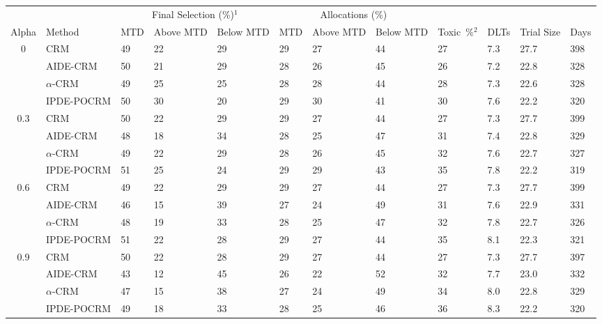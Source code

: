 \begin{tabular*}{\textwidth}{@{\extracolsep\fill}clllllllllll@{\extracolsep\fill}}
\toprule
&  & \multicolumn{3}{c}{Final Selection (\%)$^1$} & \multicolumn{3}{c}{Allocations (\%)} & &  &  &  \\
\multirow{2}{2em}{Alpha} & \multirow{2}{2em}{Method} & \multirow{2}{2em}{MTD} & \multirow{2}{2em}{Above MTD} & \multirow{2}{2em}{Below MTD} & \multirow{2}{2em}{MTD} & \multirow{2}{2em}{Above MTD} & \multirow{2}{2em}{Below MTD} & \multirow{2}{2em}{Toxic~\%$^2$} & \multirow{2}{2em}{DLTs} & \multirow{2}{2em}{Trial Size} & \multirow{2}{2em}{Days}  \\ \\ 
\midrule
\multirow{4}{2em}{0} & CRM & 49 & 22 & 29 & 29 & 27 & 44 & 27 & 7.3 & 27.7 & 398\\
 & AIDE-CRM & 50 & 21 & 29 & 28 & 26 & 45 & 26 & 7.2 & 22.8 & 328\\
 & $\alpha$-CRM & 49 & 25 & 25 & 28 & 28 & 44 & 28 & 7.3 & 22.6 & 328\\
 & IPDE-POCRM & 50 & 30 & 20 & 29 & 30 & 41 & 30 & 7.6 & 22.2 & 320\\
\midrule
\multirow{4}{2em}{0.3} & CRM & 50 & 22 & 29 & 29 & 27 & 44 & 27 & 7.3 & 27.7 & 399\\
 & AIDE-CRM & 48 & 18 & 34 & 28 & 25 & 47 & 31 & 7.4 & 22.8 & 329\\
 & $\alpha$-CRM & 49 & 22 & 29 & 28 & 26 & 45 & 32 & 7.6 & 22.7 & 327\\
 & IPDE-POCRM & 51 & 25 & 24 & 29 & 29 & 43 & 35 & 7.8 & 22.2 & 319\\
\midrule
\multirow{4}{2em}{0.6} & CRM & 49 & 22 & 29 & 29 & 27 & 44 & 27 & 7.3 & 27.7 & 399\\
 & AIDE-CRM & 46 & 15 & 39 & 27 & 24 & 49 & 31 & 7.6 & 22.9 & 331\\
 & $\alpha$-CRM & 48 & 19 & 33 & 28 & 25 & 47 & 32 & 7.8 & 22.7 & 326\\
 & IPDE-POCRM & 51 & 22 & 28 & 29 & 27 & 44 & 35 & 8.1 & 22.3 & 321\\
\midrule
\multirow{4}{2em}{0.9} & CRM & 50 & 22 & 28 & 29 & 27 & 44 & 27 & 7.3 & 27.7 & 397\\
 & AIDE-CRM & 43 & 12 & 45 & 26 & 22 & 52 & 32 & 7.7 & 23.0 & 332\\
 & $\alpha$-CRM & 47 & 15 & 38 & 27 & 24 & 49 & 34 & 8.0 & 22.8 & 329\\
 & IPDE-POCRM & 49 & 18 & 33 & 28 & 25 & 46 & 36 & 8.3 & 22.2 & 320\\
\bottomrule
\end{tabular*}
